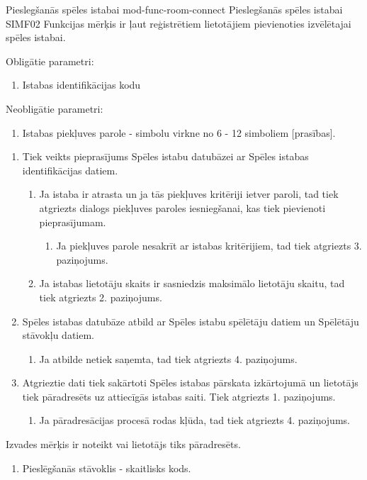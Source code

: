\moduleFunctionTable
{Pieslegšanās spēles istabai}
{mod-func-room-connect}
{Pieslegšanās spēles istabai}
{SIMF02}
{
	Funkcijas mērķis ir ļaut reģistrētiem lietotājiem pievienoties izvēlētajai spēles istabai.
}
{
	Obligātie parametri:
	\begin{enumerate}
		\item Istabas identifikācijas kodu
	\end{enumerate}
	Neobligātie parametri:
	\begin{enumerate}
		\item Istabas piekļuves parole - simbolu virkne no 6 - 12 simboliem [prasības].
	\end{enumerate}
}
{
	\begin{enumerate}
		\item Tiek veikts pieprasījums Spēles istabu datubāzei ar Spēles istabas identifikācijas datiem.
		      \begin{enumerate}
			      \item Ja istaba ir atrasta un ja tās piekļuves kritēriji ietver paroli, tad tiek atgriezts dialogs piekļuves paroles iesniegšanai, kas tiek pievienoti pieprasījumam.
			            \begin{enumerate}
				            \item Ja piekļuves parole nesakrīt ar istabas kritērijiem, tad tiek atgriezts 3. paziņojums.
			            \end{enumerate}
			      \item Ja istabas lietotāju skaits ir sasniedzis maksimālo lietotāju skaitu, tad tiek atgriezts 2. paziņojums.
		      \end{enumerate}
		\item Spēles istabas datubāze atbild ar Spēles istabu spēlētāju datiem un Spēlētāju stāvokļu datiem.
		      \begin{enumerate}
			      \item Ja atbilde netiek saņemta, tad tiek atgriezts 4. paziņojums.
		      \end{enumerate}
		\item Atgrieztie dati tiek sakārtoti Spēles istabas pārskata izkārtojumā un lietotājs tiek pāradresēts uz attiecīgās istabas saiti. Tiek atgriezts 1. paziņojums.
		      \begin{enumerate}
			      \item Ja pāradresācijas procesā rodas kļūda, tad tiek atgriezts 4. paziņojums.
		      \end{enumerate}
	\end{enumerate}
}
{
	Izvades mērķis ir noteikt vai lietotājs tiks pāradresēts.
	\begin{enumerate}
		\item Pieslēgšanās stāvoklis - skaitlisks kods.
	\end{enumerate}
}
